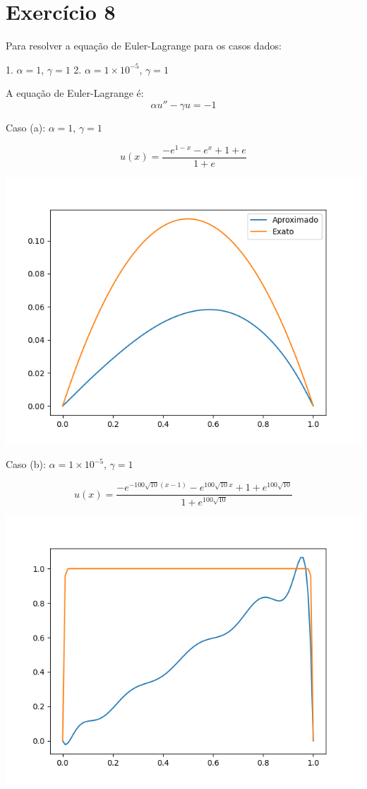 \documentclass{article}
\begin{document}
\section{Exercício 8}

Para resolver a equação de Euler-Lagrange para os casos dados:

1. \( \alpha = 1 \), \( \gamma = 1 \)
2. \( \alpha = 1 \times 10^{-5} \), \( \gamma = 1 \)

A equação de Euler-Lagrange é:
\[ \alpha u'' - \gamma u = -1 \]

Caso (a): \(\alpha = 1\), \(\gamma = 1\)

\[ u(x) = \frac{-e^{1 - x} - e^x + 1 + e}{1 + e} \]

\begin{center}
    \includegraphics[width=1\textwidth]{exercicio8_alpha_grande.png}
\end{center}


Caso (b): \(\alpha = 1 \times 10^{-5}\), \(\gamma = 1\)

\[ u(x) = \frac{-e^{-100 \sqrt{10} (x - 1)} - e^{100 \sqrt{10} x} + 1 + e^{100 \sqrt{10}}}{1 + e^{100 \sqrt{10}}} \]

\begin{center}
    \includegraphics[width=1\textwidth]{exercicio8_alpha_pequeno.png}
\end{center}
\end{document}
